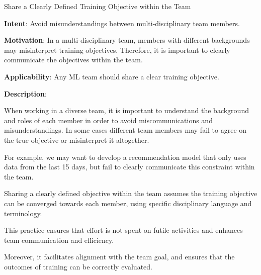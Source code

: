   
  \begin{frame}[plain]{ Share a Clearly Defined Training Objective within the Team
 }

  \textbf{Intent}: Avoid misunderstandings between multi-disciplinary team members. 
 

  \textbf{Motivation}: In a multi-disciplinary team, members with different backgrounds may misinterpret training objectives. Therefore, it is important to clearly communicate the objectives within the team. 
 

  \textbf{Applicability}: Any ML team should share a clear training objective.
 

  \textbf{Description}: 

When working in a diverse team, it is important to understand the background and roles of each member in order to avoid miscommunications and misunderstandings.
In some cases different team members may fail to agree on the true objective or misinterpret it altogether.


For example, we may want to develop a recommendation model that only uses data from the last 15 days, but fail to clearly communicate this constraint within the team.


Sharing a clearly defined objective within the team assumes the training objective can be converged towards each member, using specific disciplinary language and terminology.


This practice ensures that effort is not spent on futile activities and enhances team communication and efficiency.


Moreover, it facilitates alignment with the team goal, and ensures that the outcomes of training can be correctly evaluated.


 


  \end{frame}

